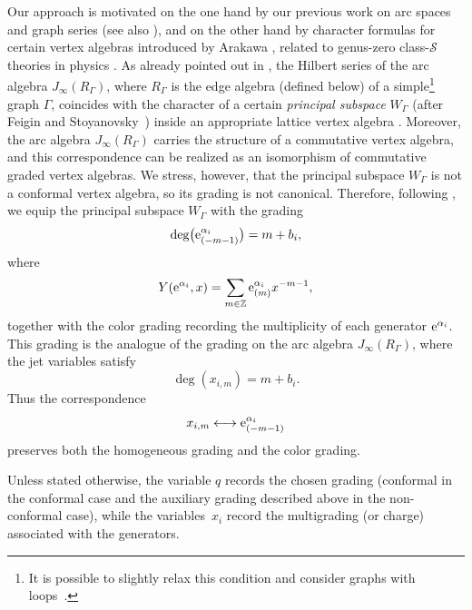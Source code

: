 \documentclass[pdftex]{sigma}
\numberwithin{equation}{section}
\theoremstyle{definition}
\begin{document}
Our
approach is motivated on the one hand by our previous work on arc spaces and graph series \cite{BJM,JM1,JM2,HM} (see also \cite{Hao}), and on the other hand by character formulas for certain vertex algebras introduced by Arakawa \cite{Arakawa}, related to genus-zero class-$\mathcal{S}$ theories in physics \cite{BR,Beem}.
As already pointed out in \cite{BJM,JM2,Hao,HM}, the Hilbert series of the arc algebra $J_\infty(R_\Gamma)$, where $R_\Gamma$ is the edge algebra (defined below) of a simple\footnote{It is possible to slightly relax this condition and consider graphs with loops~\cite{Hao}.} graph $\Gamma$, coincides with the character of a certain {\em principal subspace} $W_\Gamma$ (after Feigin and Stoyanovsky~\cite{FS}) inside an appropriate lattice vertex algebra \cite{CLM,Kawasetsu, MP}. Moreover, the arc algebra $J_\infty(R_\Gamma)$ carries the structure of a commutative vertex algebra, and this correspondence can be realized as an isomorphism of commutative graded vertex algebras. We stress, however, that the principal subspace $W_\Gamma$ is not a conformal vertex algebra, so its grading is not canonical.
Therefore, following \cite{Hao}, we equip the principal subspace $W_\Gamma$ with the grading
\[
\deg \bigl({\rm e}^{\alpha_i}_{(-m-1)}\bigr)=m+b_i,
\]
where
\[
Y({\rm e}^{\alpha_i},x)=\sum_{m\in\mathbb{Z}} {\rm e}^{\alpha_i}_{(m)}x^{-m-1},
\]
together with the color grading recording the multiplicity of each generator ${\rm e}^{\alpha_i}$. This grading is the analogue of the grading on the arc algebra $J_\infty(R_\Gamma)$, where the jet variables satisfy
\[
\deg(x_{i,m})=m+b_i.
\]
Thus the correspondence
\[
x_{i,m}
\longleftrightarrow
{\rm e}^{\alpha_i}_{(-m-1)}
\]
preserves both the homogeneous grading and the color grading.

Unless stated otherwise, the variable $q$ records the chosen grading
(conformal in the conformal case and the auxiliary grading described above in
the non-conformal case), while the variables~$x_i$ record the multigrading (or
charge) associated with the generators.
\end{document}
